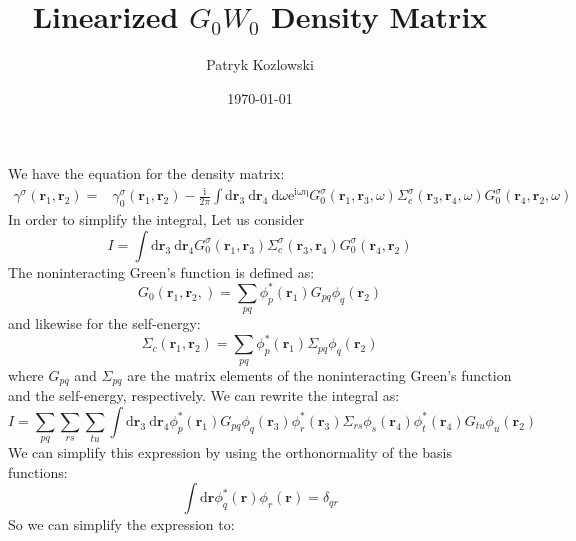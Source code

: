 \documentclass[12pt]{article}
\title{Linearized $G_0W_0$ Density Matrix}
\author{Patryk Kozlowski}
\date{\today}
\begin{document}
\maketitle
We have the equation for the density matrix:
\begin{equation}
\begin{aligned}
\gamma^\sigma\left(\mathbf{r}_1, \mathbf{r}_2\right)= & \gamma_0^\sigma\left(\mathbf{r}_1, \mathbf{r}_2\right) -\frac{\mathrm{i}}{2 \pi} \int \mathrm{d} \mathbf{r}_3 \mathrm{~d} \mathbf{r}_4 \mathrm{~d} \omega \mathrm{e}^{\mathrm{i \omega \eta}} G_0^\sigma\left(\mathbf{r}_1, \mathbf{r}_3, \omega\right) \Sigma_c^\sigma\left(\mathbf{r}_3, \mathbf{r}_4, \omega\right) G_0^\sigma\left(\mathbf{r}_4, \mathbf{r}_2, \omega\right)
\label{eqn:init_dm}
\end{aligned}
\end{equation}
In order to simplify the integral, Let us consider
\begin{equation}
I = \int \mathrm{d} \mathbf{r}_3 \mathrm{~d} \mathbf{r}_4  G_0^\sigma\left(\mathbf{r}_1, \mathbf{r}_3\right) \Sigma_c^\sigma\left(\mathbf{r}_3, \mathbf{r}_4\right) G_0^\sigma\left(\mathbf{r}_4, \mathbf{r}_2\right)
\end{equation}
The noninteracting Green's function is defined as:
\begin{equation}
G_0\left(\mathbf{r}_1, \mathbf{r}_2, \right) = \sum_{pq} \phi_p^*(\mathbf{r}_1) G_{p q} \phi_q(\mathbf{r}_2)
\end{equation}
and likewise for the self-energy:
\begin{equation}
\Sigma_c\left(\mathbf{r}_1, \mathbf{r}_2\right) = \sum_{pq} \phi_p^*(\mathbf{r}_1) \Sigma_{ p q} \phi_q(\mathbf{r}_2)
\end{equation}
where $G_{p q}$ and $\Sigma_{p q}$ are the matrix elements of the noninteracting Green's function and the self-energy, respectively. We can rewrite the integral as:
\begin{equation}
I = \sum_{pq} \sum_{rs} \sum_{tu} \int \mathrm{d} \mathbf{r}_3 \mathrm{~d} \mathbf{r}_4 \phi_p^*(\mathbf{r}_1) G_{p q} \phi_q(\mathbf{r}_3) \phi_r^*(\mathbf{r}_3) \Sigma_{r s} \phi_s(\mathbf{r}_4) \phi_t^*(\mathbf{r}_4) G_{t u} \phi_u(\mathbf{r}_2)
\end{equation}
We can simplify this expression by using the orthonormality of the basis functions:
\begin{equation}
\int \mathrm{d} \mathbf{r} \phi_q^*(\mathbf{r}) \phi_r(\mathbf{r}) = \delta_{qr}
\end{equation}
So we can simplify the expression to:
\end{document}
